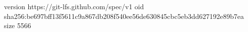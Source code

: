 version https://git-lfs.github.com/spec/v1
oid sha256:be697bff13f5611c9a867db208f540ee56de630845cbc5eb3dd627192e89b7ea
size 5566
